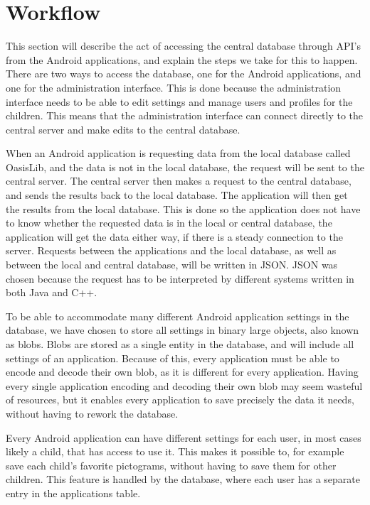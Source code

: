 \section{Workflow}
This section will describe the act of accessing the central database through API's from the Android applications, and explain the steps we take for this to happen. There are two ways to access the database, one for the Android applications, and one for the administration interface. This is done because the administration interface needs to be able to edit settings and manage users and profiles for the children. This means that the administration interface can connect directly to the central server and make edits to the central database.

When an Android application is requesting data from the local database called OasisLib, and the data is not in the local database, the request will be sent to the central server. The central server then makes a request to the central database, and sends the results back to the local database. The application will then get the results from the local database. This is done so the application does not have to know whether the requested data is in the local or central database, the application will get the data either way, if there is a steady connection to the server. Requests between the applications and the local database, as well as between the local and central database, will be written in JSON. JSON was chosen because the request has to be interpreted by different systems written in both Java and C++.

To be able to accommodate many different Android application settings in the database, we have chosen to store all settings in binary large objects, also known as blobs. Blobs are stored as a single entity in the database, and will include all settings of an application. Because of this, every application must be able to encode and decode their own blob, as it is different for every application. Having every single application encoding and decoding their own blob may seem wasteful of resources, but it enables every application to save precisely the data it needs, without having to rework the database.

Every Android application can have different settings for each user, in most cases likely a child, that has access to use it. This makes it possible to, for example save each child's favorite pictograms, without having to save them for other children. This feature is handled by the database, where each user has a separate entry in the applications table.